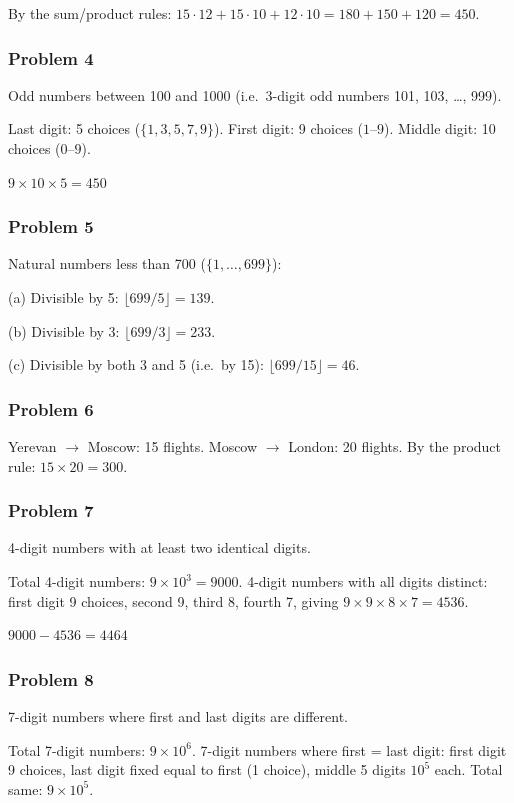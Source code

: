 By the sum/product rules:
$15\cdot12 + 15\cdot10 + 12\cdot10 = 180+150+120 = \boxed{450}$.

\subsubsection*{Problem 4}
Odd numbers between 100 and 1000 (i.e.\ 3-digit odd numbers 101, 103, \ldots, 999).

Last digit: 5 choices ($\{1,3,5,7,9\}$).
First digit: 9 choices ($1$--$9$).
Middle digit: 10 choices ($0$--$9$).

$\boxed{9 \times 10 \times 5 = 450}$

\subsubsection*{Problem 5}
Natural numbers less than 700 ($\{1,\dots,699\}$):

(a) Divisible by 5: $\lfloor 699/5\rfloor = \boxed{139}$.

(b) Divisible by 3: $\lfloor 699/3\rfloor = \boxed{233}$.

(c) Divisible by both 3 and 5 (i.e.\ by 15): $\lfloor 699/15\rfloor = \boxed{46}$.

\subsubsection*{Problem 6}
Yerevan $\to$ Moscow: 15 flights. Moscow $\to$ London: 20 flights.
By the product rule: $\boxed{15 \times 20 = 300}$.

\subsubsection*{Problem 7}
4-digit numbers with at least two identical digits.

Total 4-digit numbers: $9\times 10^3 = 9000$.
4-digit numbers with all digits distinct: first digit 9 choices, second 9, third 8, fourth 7, giving $9\times 9\times 8\times 7 = 4536$.

$\boxed{9000 - 4536 = 4464}$

\subsubsection*{Problem 8}
7-digit numbers where first and last digits are different.

Total 7-digit numbers: $9\times 10^6$.
7-digit numbers where first = last digit: first digit 9 choices, last digit fixed equal to first (1 choice), middle 5 digits $10^5$ each. Total same: $9\times 10^5$.

